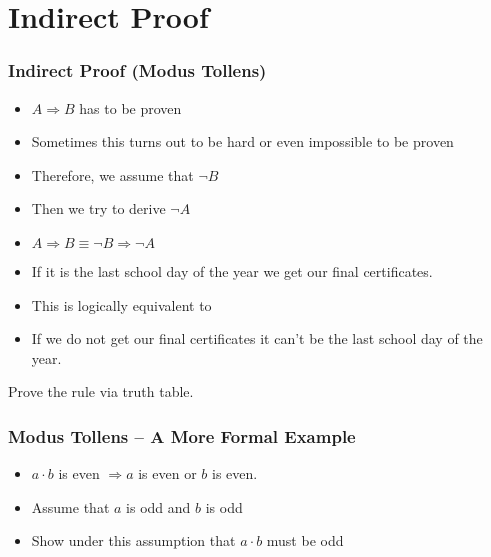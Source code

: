 \documentclass{beamer}
\theoremstyle{remark}
\begin{document}
\section{Indirect Proof}
\begin{frame}
\frametitle{Indirect Proof (Modus Tollens)}
	
\begin{itemize}
	\item $A \Rightarrow B$ has to be proven
	\pause
	\item Sometimes this turns out to be hard or even impossible to be proven
	\pause
	\item Therefore, we assume that $\lnot B$
	\pause
	\item Then we try to derive $\lnot A$
	\pause
	\item $A \Rightarrow B \equiv \lnot B \Rightarrow \lnot A$ 
\end{itemize}

\pause
\begin{example}
\begin{itemize}
	 \item If it is the last school day of the year we get our final certificates.
	 \pause
	 \item This is logically equivalent to
	 \pause
	 \item If we do not get our final certificates it can't be the last school day of the year.
\end{itemize}
\end{example}
\pause
Prove the rule via truth table.
\end{frame}

\begin{frame}
\frametitle{Modus Tollens -- A More Formal Example}
\begin{example}
\begin{itemize}
	 \item $a \cdot b$ is even $\Rightarrow a$ is even or $b$ is even.
	 \pause
	 \item Assume that $a$ is odd and $b$ is odd
	 \pause
	 \item Show under this assumption that $a \cdot b$ must be odd
\end{itemize}
\end{example}
\end{frame}
\end{document}
